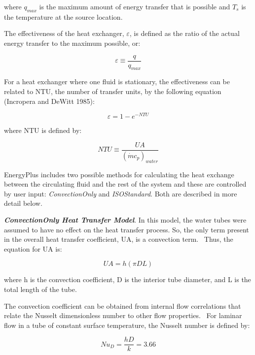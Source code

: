 where \(q_{max}\) is the maximum amount of energy transfer that is possible and \(T_s\) is the temperature at the source location.

The effectiveness of the heat exchanger, \(\varepsilon\), is defined as the ratio of the actual energy transfer to the maximum possible, or:

\begin{equation}
\varepsilon  \equiv \frac{q}{{{q_{max }}}}
\label{eq:RadSysHX675}
\end{equation}

For a heat exchanger where one fluid is stationary, the effectiveness can be related to NTU, the number of transfer units, by the following equation (Incropera and DeWitt 1985):

\begin{equation}
\varepsilon  = 1 - {e^{ - NTU}}
\end{equation}

where NTU is defined by:

\begin{equation}
NTU \equiv \frac{{UA}}{{{{\left( {\dot m{c_p}} \right)}_{water}}}}
\label{eq:NTURadSysEquationGeneric}
\end{equation}

EnergyPlus includes two possible methods for calculating the heat exchange between the circulating fluid and the rest of the system and these are controlled by user input: {\emph{ConvectionOnly} and \emph{ISOStandard}}.  Both are described in more detail below.

\textbf{\emph{ConvectionOnly Heat Transfer Model}}.  In this model, the water tubes were assumed to have no effect on the heat transfer process.  So, the only term present in the overall heat transfer coefficient, UA, is a convection term.~ Thus, the equation for UA is:

\begin{equation}
UA = h\left( {\pi DL} \right)
\end{equation}

where h is the convection coefficient, D is the interior tube diameter, and L is the total length of the tube.

The convection coefficient can be obtained from internal flow correlations that relate the Nusselt dimensionless number to other flow properties.~ For laminar flow in a tube of constant surface temperature, the Nusselt number is defined by:

\begin{equation}
N{u_D} = \frac{{hD}}{k} = 3.66
\end{equation}

